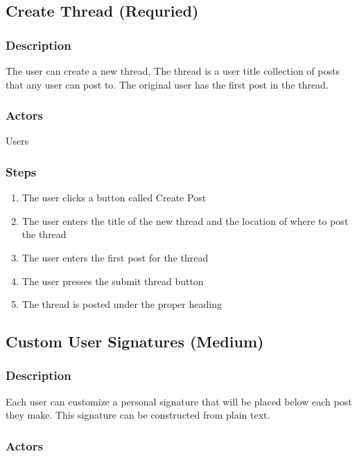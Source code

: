 \documentclass[12pt]{scrartcl}
\begin{document}
\subsection{Create Thread (Requried)}
\subsubsection{Description}

The user can create a new thread. The thread is a user title collection of posts that any user can post to. The original user has the first post in the thread.

\subsubsection{Actors}

Users

\subsubsection{Steps}

\begin{enumerate}
\item The user clicks a button called Create Post 
\item The user enters the title of the new thread and the location of where to post the thread
\item The user enters the first post for the thread
\item The user presses the submit thread button
\item The thread is posted under the proper heading
\end{enumerate}

\subsection{Custom User Signatures (Medium)}
\subsubsection{Description}

Each user can customize a personal signature that will be placed below each post they make. This signature can be constructed from plain text.

\subsubsection{Actors}
\end{document}
